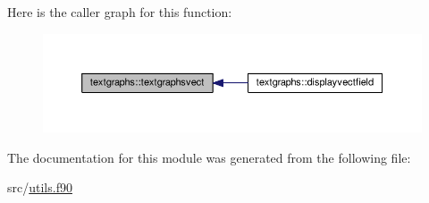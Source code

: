 Here is the caller graph for this function\+:\nopagebreak
\begin{figure}[H]
\begin{center}
\leavevmode
\includegraphics[width=350pt]{classtextgraphs_a3ce903686e3a69e50f07b7f1461c53c6_icgraph}
\end{center}
\end{figure}




The documentation for this module was generated from the following file\+:\begin{DoxyCompactItemize}
\item 
src/\hyperlink{utils_8f90}{utils.\+f90}\end{DoxyCompactItemize}
